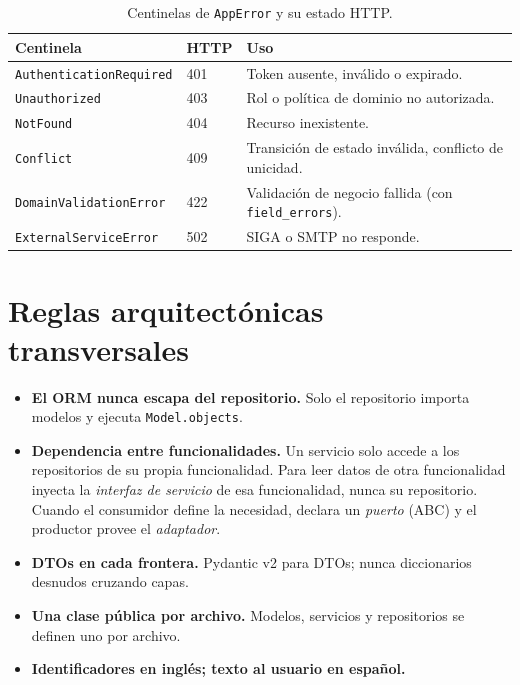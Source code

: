 \documentclass[12pt,letterpaper]{report}
\begin{document}
\begin{table}[H]
\centering
\caption{Centinelas de \texttt{AppError} y su estado HTTP.}
\begin{tabularx}{\textwidth}{L{5.2cm} L{2.2cm} X}
\toprule
\textbf{Centinela} & \textbf{HTTP} & \textbf{Uso} \\
\midrule
\texttt{AuthenticationRequired} & 401 & Token ausente, inválido o expirado. \\
\texttt{Unauthorized}           & 403 & Rol o política de dominio no autorizada. \\
\texttt{NotFound}               & 404 & Recurso inexistente. \\
\texttt{Conflict}               & 409 & Transición de estado inválida, conflicto de unicidad. \\
\texttt{DomainValidationError}  & 422 & Validación de negocio fallida (con \texttt{field\_errors}). \\
\texttt{ExternalServiceError}   & 502 & SIGA o SMTP no responde. \\
\bottomrule
\end{tabularx}
\end{table}

\section{Reglas arquitectónicas transversales}

\begin{itemize}[leftmargin=1.4em]
  \item \textbf{El ORM nunca escapa del repositorio.} Solo el repositorio importa
  modelos y ejecuta \texttt{Model.objects}.
  \item \textbf{Dependencia entre funcionalidades.} Un servicio solo accede a los
  repositorios de su propia funcionalidad. Para leer datos de otra funcionalidad
  inyecta la \emph{interfaz de servicio} de esa funcionalidad, nunca su
  repositorio. Cuando el consumidor define la necesidad, declara un \emph{puerto}
  (ABC) y el productor provee el \emph{adaptador}.
  \item \textbf{DTOs en cada frontera.} Pydantic v2 para DTOs; nunca diccionarios
  desnudos cruzando capas.
  \item \textbf{Una clase pública por archivo.} Modelos, servicios y repositorios
  se definen uno por archivo.
  \item \textbf{Identificadores en inglés; texto al usuario en español.}
\end{itemize}
\end{document}
